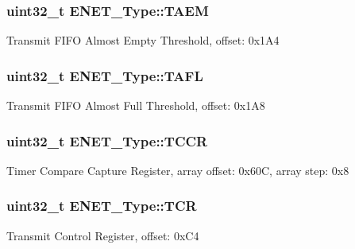 \subsubsection[{\texorpdfstring{T\+A\+EM}{TAEM}}]{ uint32\+\_\+t E\+N\+E\+T\+\_\+\+Type\+::\+T\+A\+EM}\hypertarget{structENET__Type_a0f774d8ca4919460b91e4fb11568a888}{}\label{structENET__Type_a0f774d8ca4919460b91e4fb11568a888}
Transmit F\+I\+FO Almost Empty Threshold, offset\+: 0x1\+A4 
\subsubsection[{\texorpdfstring{T\+A\+FL}{TAFL}}]{ uint32\+\_\+t E\+N\+E\+T\+\_\+\+Type\+::\+T\+A\+FL}\hypertarget{structENET__Type_ac673b821561ab611b0b1ba10ca44d885}{}\label{structENET__Type_ac673b821561ab611b0b1ba10ca44d885}
Transmit F\+I\+FO Almost Full Threshold, offset\+: 0x1\+A8 
\subsubsection[{\texorpdfstring{T\+C\+CR}{TCCR}}]{ uint32\+\_\+t E\+N\+E\+T\+\_\+\+Type\+::\+T\+C\+CR}\hypertarget{structENET__Type_a0250ac5aaad7995bb08b2213c6e1719f}{}\label{structENET__Type_a0250ac5aaad7995bb08b2213c6e1719f}
Timer Compare Capture Register, array offset\+: 0x60C, array step\+: 0x8 
\subsubsection[{\texorpdfstring{T\+CR}{TCR}}]{ uint32\+\_\+t E\+N\+E\+T\+\_\+\+Type\+::\+T\+CR}\hypertarget{structENET__Type_a44766d369a9340a077907deed6107f78}{}\label{structENET__Type_a44766d369a9340a077907deed6107f78}
Transmit Control Register, offset\+: 0x\+C4 
